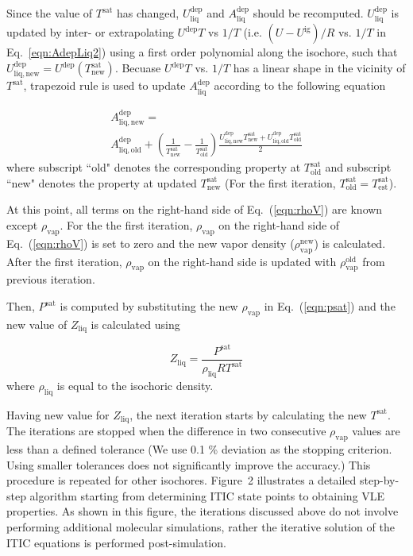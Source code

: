 \documentclass[5p,times]{elsarticle}
\begin{document}
Since the value of $T^\mathrm{sat}$ has changed, $U^\mathrm{dep}_\mathrm{liq}$ and $A^\mathrm{dep}_\mathrm{liq}$ should be recomputed. $U^\mathrm{dep}_\mathrm{liq}$ is updated by inter- or extrapolating $U^\mathrm{dep}T$ vs $1/T$ (i.e. $(U-U^\mathrm{ig})/R$ vs. $1/T$ in Eq.~\ref{eqn:AdepLiq2}) using a first order polynomial along the isochore, such that $U^\mathrm{dep}_\mathrm{liq,new} = U^\mathrm{dep}(T^\mathrm{sat}_\mathrm{new})$. Becuase $U^\mathrm{dep}T$ vs. $1/T$ has a linear shape in the vicinity of $T^\mathrm{sat}$, trapezoid rule is used to update $A^\mathrm{dep}_\mathrm{liq}$ according to the following equation

\begin{equation}
\begin{array}{l}
A^\mathrm{dep}_\mathrm{liq,new} = 
\\
A^\mathrm{dep}_\mathrm{liq,old} + \left( \frac{1}{T^\mathrm{sat}_\mathrm{new}}-\frac{1}{T^\mathrm{sat}_\mathrm{old}} \right) \frac{U^\mathrm{dep}_\mathrm{liq,new}T^\mathrm{sat}_\mathrm{new}+U^\mathrm{dep}_\mathrm{liq,old}T^\mathrm{sat}_\mathrm{old}}{2} 
\end{array}
\label{eqn:aDepCorrection}
\end{equation}
where subscript ``old" denotes the corresponding property at $T^\mathrm{sat}_\mathrm{old}$ and subscript ``new" denotes the property at updated $T^\mathrm{sat}_\mathrm{new}$ (For the first iteration, $T^\mathrm{sat}_\mathrm{old} = T^\mathrm{sat}_\mathrm{est}$). 

At this point, all terms on the right-hand side of Eq.~(\ref{eqn:rhoV}) are known except $\rho_\mathrm{vap}$. For the the first iteration, $\rho_\mathrm{vap}$ on the right-hand side of Eq.~(\ref{eqn:rhoV}) is set to zero and the new vapor density ($\rho_\mathrm{vap}^\mathrm{new}$) is calculated. After the first iteration, $\rho_\mathrm{vap}$ on the right-hand side is updated with $\rho_\mathrm{vap}^\mathrm{old}$ from previous iteration. 

Then, $P^\mathrm{sat}$ is computed by substituting the new $\rho_\mathrm{vap}$ in Eq.~(\ref{eqn:psat}) and the new value of $Z_\mathrm{liq}$ is calculated using

\begin{equation}
{Z_{\mathrm{liq}}} = \frac{P^\mathrm{sat}}{\rho_\mathrm{liq}RT^\mathrm{sat}}  
\label{eqn:zliq}
\end{equation}
where $\rho_\mathrm{liq}$ is equal to the isochoric density.

Having new value for $Z_{\mathrm{liq}}$, the next iteration starts by calculating the new $T^\mathrm{sat}$. The iterations are stopped when the difference in two consecutive $\rho_\mathrm{vap}$ values are less than a defined tolerance (We use 0.1 \% deviation as the stopping criterion. Using smaller tolerances does not significantly improve the accuracy.) This procedure is repeated for other isochores. Figure~2 illustrates a detailed step-by-step algorithm starting from determining ITIC state points to obtaining VLE properties. As shown in this figure, the iterations discussed above do not involve performing additional molecular simulations, rather the iterative solution of the ITIC equations is performed post-simulation. 
\end{document}

